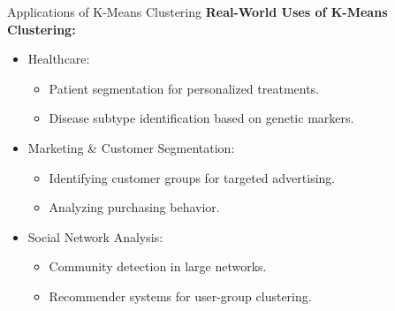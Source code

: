 \documentclass[aspectratio=169,xcolor=dvipsnames]{beamer}
\begin{document}
\begin{frame}{Applications of K-Means Clustering}
    \textbf{Real-World Uses of K-Means Clustering:}
    \begin{itemize}
    \setlength\itemsep{0.33cm}
        \item Healthcare:
        \begin{itemize}
            \item Patient segmentation for personalized treatments.
            \item Disease subtype identification based on genetic markers.
        \end{itemize}
        \item Marketing \& Customer Segmentation:
        \begin{itemize}
            \item Identifying customer groups for targeted advertising.
            \item Analyzing purchasing behavior.
        \end{itemize}
        \item Social Network Analysis:
        \begin{itemize}
            \item Community detection in large networks.
            \item Recommender systems for user-group clustering.
        \end{itemize}
    \end{itemize}
\end{frame}
\end{document}
